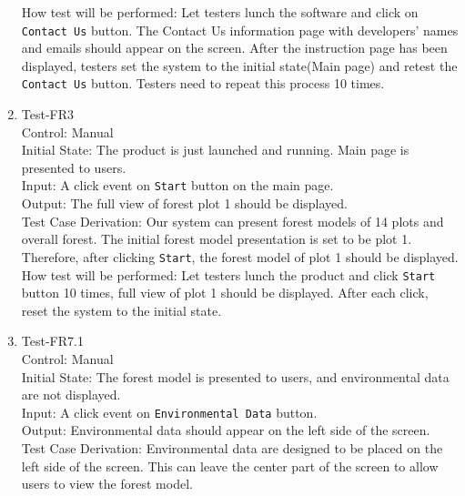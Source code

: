 \documentclass[12pt, titlepage]{article}
\begin{document}
\begin{enumerate}
How test will be performed: Let testers lunch the software and click
on  \verb|Contact Us| button. The Contact Us information page with 
developers' names and emails should appear on the  screen. 
After the instruction page has been displayed, testers set the 
system to the initial state(Main page) and retest the 
\verb|Contact Us| button. Testers need to repeat this process 10 times.


\item{Test-FR3\\}
Control: Manual\\ 

Initial State: The product is just launched and running. Main page
is presented to users.\\

Input: A click event on \verb|Start| button on the main page.\\

Output: The full view of forest plot 1 should be displayed. \\

Test Case Derivation: Our system can present forest models of
14 plots and overall forest. The initial forest model presentation
is set to be plot 1. Therefore, after clicking \verb|Start|, 
the forest model of plot 1 should be displayed.\\
					
How test will be performed: Let testers lunch the product and click 
\verb|Start| button 10 times, full view of plot 1 should be 
displayed. After each click, reset the system to the initial 
state.


\item{Test-FR7.1\\}
Control: Manual\\ 

Initial State: The forest model is presented to users, and 
environmental data are not displayed.\\

Input: A click event on \verb|Environmental Data| button.\\

Output: Environmental data should appear on the left side of the 
screen.\\

Test Case Derivation: Environmental data are designed to be placed
on the left side of the screen. This can leave the center part 
of the screen to allow users to view the forest model.\\
					

\end{enumerate}
\end{document}

